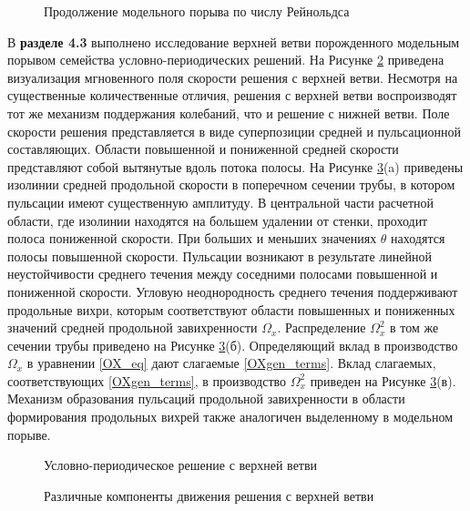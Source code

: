 \begin{figure}
\caption{Продолжение модельного порыва по числу Рейнольдса}
\label{contin_pic}
\end{figure} 

В \textbf{разделе 4.3} выполнено исследование верхней ветви порожденного модельным порывом семейства условно-периодических решений. На Рисунке \ref{3D_ub_pic} приведена визуализация мгновенного поля скорости решения с верхней ветви. Несмотря на существенные количественные отличия, решения с верхней ветви воспроизводят тот же механизм поддержания колебаний, что и решение с нижней ветви. Поле скорости решения представляется в виде суперпозиции средней и пульсационной составляющих. Области повышенной и пониженной средней скорости представляют собой вытянутые вдоль потока полосы. На Рисунке \ref{ub_cs_pic}(a) приведены изолинии средней продольной скорости в поперечном сечении трубы, в котором пульсации имеют существенную амплитуду. В центральной части расчетной области, где изолинии находятся на большем удалении от стенки, проходит полоса пониженной скорости. При больших и меньших значениях $\theta$ находятся полосы повышенной скорости. Пульсации возникают в результате линейной неустойчивости среднего течения между соседними полосами повышенной и пониженной скорости. Угловую неоднородность среднего течения поддерживают продольные вихри, которым соответствуют области повышенных и пониженных значений средней продольной завихренности $\Omega_x$. Распределение $\Omega^2_x$ в том же сечении трубы приведено на Рисунке \ref{ub_cs_pic}(б). Определяющий вклад в производство $\Omega_x$ в уравнении \eqref{OX_eq} дают слагаемые \eqref{OXgen_terms}. Вклад слагаемых, соответствующих \eqref{OXgen_terms}, в производство $\Omega^2_x$ приведен на Рисунке \ref{ub_cs_pic}(в). Механизм образования пульсаций продольной завихренности в области формирования продольных вихрей также аналогичен выделенному в модельном порыве. 


\begin{figure}
\caption{Условно-периодическое решение с верхней ветви}
\label{3D_ub_pic}
\end{figure} 


\begin{figure}
\caption{Различные компоненты движения решения с верхней ветви}
\label{ub_cs_pic}
\end{figure}



